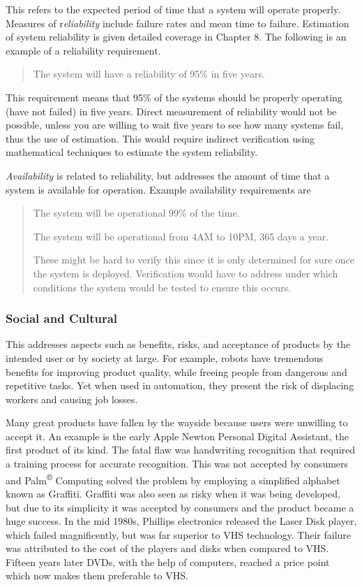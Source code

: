 This refers to the expected period of time that a system will operate
properly. Measures of r\emph{eliability} include failure rates and mean
time to failure. Estimation of system reliability is given detailed
coverage in Chapter 8. The following is an example of a reliability
requirement.

\begin{quote}
The system will have a reliability of 95\% in five years.
\end{quote}

This requirement means that 95\% of the systems should be properly
operating (have not failed) in five years. Direct measurement of
reliability would not be possible, unless you are willing to wait five
years to see how many systems fail, thus the use of estimation. This
would require indirect verification using mathematical techniques to
estimate the system reliability.

\emph{Availability} is related to reliability, but addresses the amount
of time that a system is available for operation. Example availability
requirements are

\begin{quote}
The system will be operational 99\% of the time.

The system will be operational from 4AM to 10PM, 365 days a year.

These might be hard to verify this since it is only determined for sure
once the system is deployed. Verification would have to address under
which conditions the system would be tested to ensure this occurs.
\end{quote}

\subsubsection*{Social and Cultural}\label{social-and-cultural}

This addresses aspects such as benefits, risks, and acceptance of
products by the intended user or by society at large. For example,
robots have tremendous benefits for improving product quality, while
freeing people from dangerous and repetitive tasks. Yet when used in
automation, they present the risk of displacing workers and causing job
losses.

Many great products have fallen by the wayside because users were
unwilling to accept it. An example is the early Apple Newton Personal
Digital Assistant, the first product of its kind. The fatal flaw was
handwriting recognition that required a training process for accurate
recognition. This was not accepted by consumers and
Palm\textsuperscript{®} Computing solved the problem by employing a
simplified alphabet known as Graffiti. Graffiti was also seen as risky
when it was being developed, but due to its simplicity it was accepted
by consumers and the product became a huge success. In the mid 1980s,
Phillips electronics released the Laser Disk player, which failed
magnificently, but was far superior to VHS technology. Their failure was
attributed to the cost of the players and disks when compared to VHS.
Fifteen years later DVDs, with the help of computers, reached a price
point which now makes them preferable to VHS.

